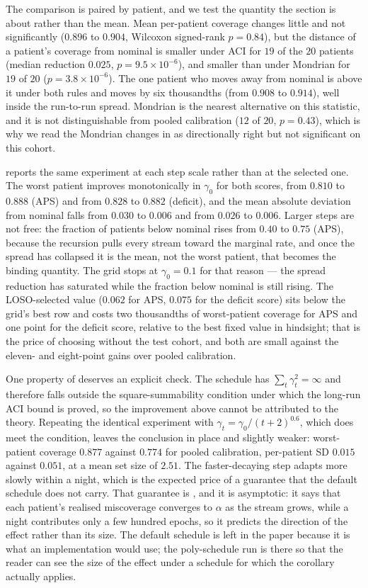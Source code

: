 The comparison is paired by patient, and we test the quantity the section is
about rather than the mean. Mean per-patient coverage changes little and not
significantly ($0.896$ to $0.904$, Wilcoxon signed-rank $p=0.84$), but the
distance of a patient's coverage from nominal is smaller under ACI for
$19$ of the $20$ patients (median reduction $0.025$, $p=9.5\times10^{-6}$),
and smaller than under Mondrian for $19$ of $20$ ($p=3.8\times10^{-6}$). The
one patient who moves away from nominal is above it under both rules and
moves by six thousandths (from $0.908$ to $0.914$), well inside the
run-to-run spread. Mondrian is the nearest
alternative on this statistic, and it is not distinguishable from pooled
calibration ($12$ of $20$, $p=0.43$), which is why we read the Mondrian
changes in  as directionally right but not
significant on this cohort.

 reports the same experiment at each step scale rather
than at the selected one. The worst patient improves monotonically in
$\gamma_0$ for both scores, from $0.810$ to $0.888$ (APS) and from $0.828$ to
$0.882$ (deficit), and the mean absolute deviation from nominal falls from
$0.030$ to $0.006$ and from $0.026$ to $0.006$. Larger steps are not free: the
fraction of patients below nominal rises from $0.40$ to $0.75$ (APS), because
the recursion pulls every stream toward the marginal rate, and once the spread
has collapsed it is the mean, not the worst patient, that becomes the binding
quantity. The grid stops at $\gamma_0=0.1$ for that reason --- the
spread reduction has saturated while the fraction below nominal is still rising.
The LOSO-selected value ($0.062$ for APS, $0.075$ for the deficit score) sits
below the grid's best row and costs two thousandths of worst-patient coverage
for APS and one point for the deficit score, relative to the best fixed value
in hindsight; that is the price of choosing without the test cohort, and both
are small against the eleven- and eight-point gains over pooled calibration.

One property of  deserves an explicit check. The schedule has
$\sum_t\gamma_t^2=\infty$ and therefore falls outside the
square-summability condition under which the long-run ACI bound is proved, so
the improvement above cannot be attributed to the theory. Repeating the
identical experiment with $\gamma_t=\gamma_0/(t+2)^{0.6}$, which does meet the
condition, leaves the conclusion in place and slightly weaker: worst-patient
coverage $0.877$ against $0.774$ for pooled calibration, per-patient SD
$0.015$ against $0.051$, at a mean set size of $2.51$. The faster-decaying
step adapts more slowly within a night, which is the expected
price of a guarantee that the default schedule does not carry. That guarantee
is , and it is asymptotic: it says that each patient's
realised miscoverage converges to $\alpha$ as the stream grows, while a night
contributes only a few hundred epochs, so it predicts the direction of the
effect rather than its size. The default schedule is left in the paper
because it is what an implementation would use; the poly-schedule run is
there so that the reader can see the size of the effect under a schedule for
which the corollary actually applies.

